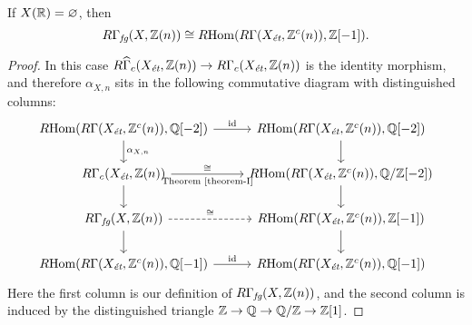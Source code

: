 \documentclass{article}
\numberwithin{equation}{section}
\begin{document}
\begin{proposition}
  \label{prop:RGamma-fg-for-X(R)-empty}
  If $X (\RR) = \emptyset$, then
  \[ R\Gamma_\fg (X, \ZZ (n)) \cong
  \RHom (R\Gamma (X_\et, \ZZ^c (n)), \ZZ [-1]). \]

  \begin{proof}
    In this case
    $R\widehat{\Gamma}_c (X_\et, \ZZ (n)) \to R\Gamma_c (X_\et, \ZZ (n))$
    is the identity morphism, and therefore $\alpha_{X,n}$ sits in the following
    commutative diagram with distinguished columns:
    \[ \begin{tikzcd}
      \RHom (R\Gamma (X_\et, \ZZ^c (n)), \QQ [-2])\ar{d}{\alpha_{X,n}} \ar{r}{\mathrm{id}} & \RHom (R\Gamma (X_\et, \ZZ^c (n)), \QQ [-2])\ar{d} \\
      R\Gamma_c (X_\et, \ZZ (n))\ar{d} \ar{r}{\cong}[swap]{\text{Theorem~\ref{theorem-I}}} & \RHom (R\Gamma (X_\et, \ZZ^c (n)), \QQ/\ZZ [-2])\ar{d} \\
      R\Gamma_\fg (X, \ZZ (n))\ar{d} \ar[dashed]{r}{\cong} & \RHom (R\Gamma (X_\et, \ZZ^c (n)), \ZZ [-1])\ar{d} \\
      \RHom (R\Gamma (X_\et, \ZZ^c (n)), \QQ [-1]) \ar{r}{\mathrm{id}} & \RHom (R\Gamma (X_\et, \ZZ^c (n)), \QQ [-1])
    \end{tikzcd} \]
    Here the first column is our definition of $R\Gamma_\fg (X, \ZZ (n))$,
    and the second column is induced by the distinguished triangle
    $\ZZ \to \QQ \to \QQ/\ZZ \to \ZZ [1]$.
  \end{proof}
\end{proposition}
\end{document}

